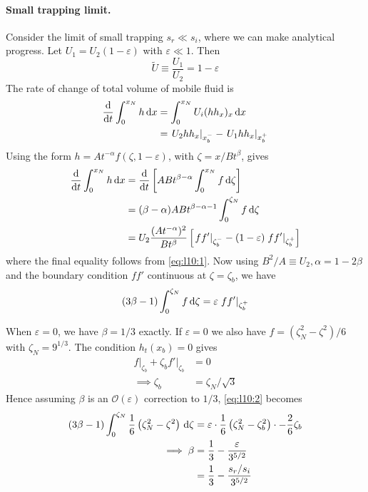 \documentclass{jknotes}
\newcommand{\veps}{\varepsilon}
\begin{document}
\paragraph{Small trapping limit.}
Consider the limit of small trapping $s_r \ll s_i$, where we can make
analytical progress. Let $U_1 = U_2(1-\veps)$ with $\veps \ll 1$. Then
\begin{equation}
	\tilde{U} \equiv \frac{U_1}{U_2} = 1-\veps
\end{equation}
The rate of change of total volume of mobile fluid is
\begin{align}
	\frac{\diffd}{\diffd t} \int_0^{x_N} h \, \diffd x 
	&= \int_0^{x_N} U_i (hh_x)_x \, \diffd x \\
	&= \left.U_2 hh_x \right|_{x_b^-} - \left. U_1 hh_x\right|_{x_b^+}
	\label{eq:l10:1}
\end{align}
Using the form $h = A t^{-\alpha}f(\zeta, 1-\veps)$, with $\zeta =
x/Bt^\beta$, gives
\begin{align}
	\frac{\diffd}{\diffd t} \int_0^{x_N} h \, \diffd x 
	&= \frac{\diffd}{\diffd t} \left[ AB t^{\beta-\alpha} \int_0^{x_N} f \,
	\diffd \zeta \right] \\
	&= (\beta - \alpha) AB t^{\beta-\alpha-1} \int_0^{\zeta_N} f \, \diffd
	\zeta \\
	&= U_2 \frac{(At^{-\alpha})^2}{Bt^\beta} \left[
	\left.ff'\right|_{\zeta_b^-} -
	(1-\veps)\left.ff'\right|_{\zeta_b^+}\right]
\end{align}
where the final equality follows from \eqref{eq:l10:1}. Now using $B^2/A
\equiv U_2, \alpha = 1-2\beta$ and the boundary condition $ff'$ continuous at
$\zeta=\zeta_b$, we have
\begin{equation}
	(3\beta -1)\int_0^{\zeta_N} f \, \diffd \zeta = \veps \left.
	ff'\right|_{\zeta_b^+} \label{eq:l10:2}
\end{equation}

When $\veps = 0$, we have $\beta = 1/3$ exactly. If $\veps =0 $ we also have
$f = (\zeta_N^2 - \zeta^2)/6$ with $\zeta_N = 9^{1/3}$. The condition
$h_t(x_b) = 0$ gives
\begin{align}
	\left.f\right|_{\zeta_b} + \zeta_b \left. f'\right|_{\zeta_b} &= 0 \\
	\implies \zeta_b &= \zeta_N/\sqrt{3}
\end{align}
Hence assuming $\beta$ is an $\mathcal{O}(\veps)$ correction to $1/3$,
\eqref{eq:l10:2} becomes
\begin{align}
(3\beta-1) \int_0^{\zeta_N} \frac{1}{6}\left(\zeta_N^2 - \zeta^2\right) \,
\diffd \zeta &= \veps \cdot \frac{1}{6}\left(\zeta_N^2 - \zeta_b^2\right)\cdot
-\frac{2}{6}\zeta_b \\
\implies \beta &= \frac{1}{3}-\frac{\veps}{3^{5/2}} \\
			   &= \frac{1}{3}-\frac{s_r/s_i}{3^{5/2}}
\end{align}
\end{document}
